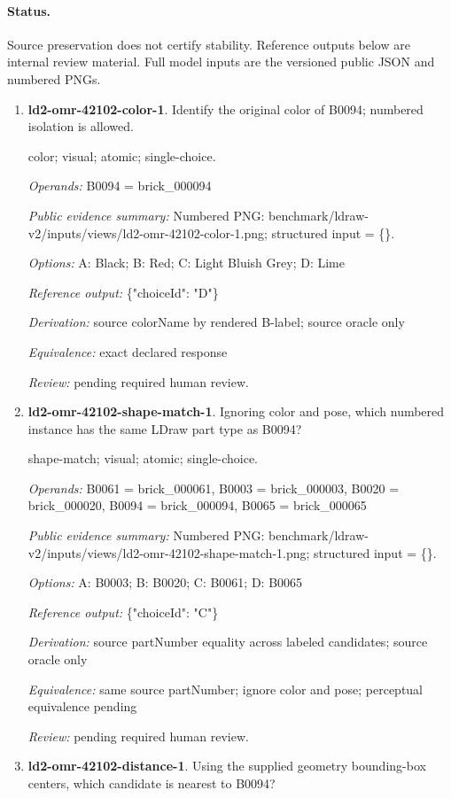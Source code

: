 \paragraph{Status.}Source preservation does not certify stability. Reference outputs below are internal review material. Full model inputs are the versioned public JSON and numbered PNGs.
\begin{enumerate}
\item \textbf{ld2-omr-42102-color-1}. Identify the original color of B0094; numbered isolation is allowed.
\par{\small color; visual; atomic; single-choice.\par\textit{Operands:} B0094 = brick\_000094\par\textit{Public evidence summary:} Numbered PNG: benchmark/ldraw-v2/inputs/views/ld2-omr-42102-color-1.png; structured input = \{\}.\par\textit{Options:} A: Black; B: Red; C: Light Bluish Grey; D: Lime\par\textit{Reference output:} \{"choiceId": "D"\}\par\textit{Derivation:} source colorName by rendered B-label; source oracle only\par\textit{Equivalence:} exact declared response\par\textit{Review:} pending required human review.}
\item \textbf{ld2-omr-42102-shape-match-1}. Ignoring color and pose, which numbered instance has the same LDraw part type as B0094?
\par{\small shape-match; visual; atomic; single-choice.\par\textit{Operands:} B0061 = brick\_000061, B0003 = brick\_000003, B0020 = brick\_000020, B0094 = brick\_000094, B0065 = brick\_000065\par\textit{Public evidence summary:} Numbered PNG: benchmark/ldraw-v2/inputs/views/ld2-omr-42102-shape-match-1.png; structured input = \{\}.\par\textit{Options:} A: B0003; B: B0020; C: B0061; D: B0065\par\textit{Reference output:} \{"choiceId": "C"\}\par\textit{Derivation:} source partNumber equality across labeled candidates; source oracle only\par\textit{Equivalence:} same source partNumber; ignore color and pose; perceptual equivalence pending\par\textit{Review:} pending required human review.}
\item \textbf{ld2-omr-42102-distance-1}. Using the supplied geometry bounding-box centers, which candidate is nearest to B0094?

\end{enumerate}
